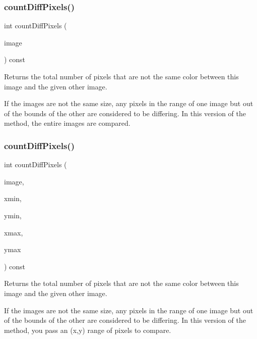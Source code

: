 \subsubsection{\texorpdfstring{count\+Diff\+Pixels()}{countDiffPixels()}\hspace{0.1cm}{\footnotesize\ttfamily [1/4]}}
{\footnotesize\ttfamily int count\+Diff\+Pixels (\begin{DoxyParamCaption}\item[{const \mbox{\hyperlink{classGCanvas}{G\+Canvas}} \&}]{image }\end{DoxyParamCaption}) const\hspace{0.3cm}{\ttfamily [virtual]}}



Returns the total number of pixels that are not the same color between this image and the given other image. 

If the images are not the same size, any pixels in the range of one image but out of the bounds of the other are considered to be differing. In this version of the method, the entire images are compared. \mbox{\label{classGCanvas_a3ed6edef8ed522bbfc09d8f6005d6d8e}} 
\subsubsection{\texorpdfstring{count\+Diff\+Pixels()}{countDiffPixels()}\hspace{0.1cm}{\footnotesize\ttfamily [2/4]}}
{\footnotesize\ttfamily int count\+Diff\+Pixels (\begin{DoxyParamCaption}\item[{const \mbox{\hyperlink{classGCanvas}{G\+Canvas}} \&}]{image,  }\item[{int}]{xmin,  }\item[{int}]{ymin,  }\item[{int}]{xmax,  }\item[{int}]{ymax }\end{DoxyParamCaption}) const\hspace{0.3cm}{\ttfamily [virtual]}}



Returns the total number of pixels that are not the same color between this image and the given other image. 

If the images are not the same size, any pixels in the range of one image but out of the bounds of the other are considered to be differing. In this version of the method, you pass an (x,y) range of pixels to compare. \mbox{\label{classGCanvas_a443b0f63a197c0f1147b13077f4206e0}} 
